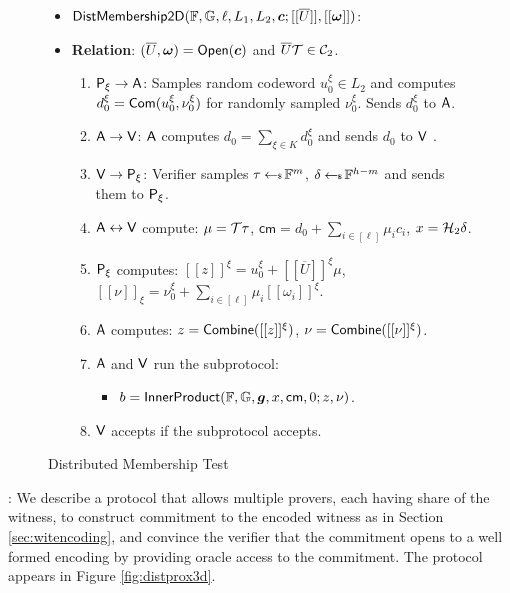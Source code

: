 \begin{figure}[h!]
\centering
\begin{framed}
\begin{itemize}
\item $\mathsf{DistMembership2D}(\mathbb{F},\mathbb{G},\ell,L_1,L_2,\bm{c};[[\overline{U}]],[[\bm{\omega}]])$:
\item {\bf Relation}: $(\overline{U},\bm{\omega})=\mathsf{Open}(\bm{c})$ and
$\overline{U}\mathcal{T}\in \mathcal{C}_2$.
\begin{enumerate}[{\rm 1.}]
\item $\mathsf{P}_\xi\rightarrow \mathsf{A}$: Samples random codeword $u^\xi_0\in L_2$ and
computes $d^\xi_0=\mathsf{Com}(u^\xi_0,\nu^\xi_0)$ for randomly sampled $\nu^\xi_0$.
Sends $d^\xi_0$ to $\mathsf{A}$.
\item {\color{red} $\mathsf{A}\rightarrow \mathsf{V}$: $\mathsf{A}$ computes $d_0=\sum_{\xi\in
K}d^\xi_0$ and sends $d_0$ to $\mathsf{V}$ }.
\item $\mathsf{V}\rightarrow \mathsf{P}_\xi$: Verifier samples $\tau\hskip2.3pt{\gets\!\!\mbox{\tiny${\$}$\normalsize}}\, \mathbb{F}^m$,
$\delta\hskip2.3pt{\gets\!\!\mbox{\tiny${\$}$\normalsize}}\, \mathbb{F}^{h-m}$ and sends them to $\mathsf{P}_\xi$.
\item $\mathsf{A}\leftrightarrow \mathsf{V}$ compute: $\mu=\mathcal{T}\tau$,
$\mathsf{cm}=d_0+\sum_{i\in [\ell]}\mu_ic_i$, $x=\mathcal{H}_2\delta$.
\item $\mathsf{P}_\xi$ computes: $[[z]]^\xi=u^\xi_0+[[\overline{U}]]^\xi\mu$,
$[[\nu]]_\xi=\nu^\xi_0+\sum_{i\in [\ell]}\mu_i[[\omega_i]]^\xi$.
\item {\color{red} $\mathsf{A}$ computes: $z=\mathsf{Combine}([[z]]^\xi)$,
$\nu=\mathsf{Combine}([[\nu]]^\xi)$}.
\item $\mathsf{A}$ and $\mathsf{V}$ run the subprotocol:
	\begin{itemize}
	\item $b=\mathsf{InnerProduct}(\mathbb{F},\mathbb{G},\bm{g},x,\mathsf{cm},0;z,\nu)$.
	\end{itemize}
\item $\mathsf{V}$ accepts if the subprotocol accepts.
\end{enumerate}
\end{itemize}
\end{framed}
\caption{Distributed Membership Test}
\label{fig:distprox2d}
\end{figure}

: We describe a protocol that allows
multiple provers, each having share of the witness, to construct commitment to
the encoded witness as in Section \ref{sec:witencoding}, and convince the
verifier that the commitment opens to a well formed encoding by providing oracle
access to the commitment. The protocol appears in Figure
\ref{fig:distprox3d}.\smallskip


